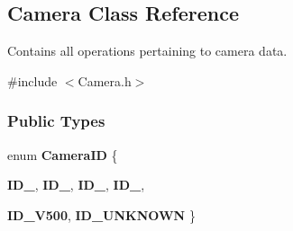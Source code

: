 \hypertarget{classCamera}{
\subsection{Camera Class Reference}
\label{classCamera}
}


Contains all operations pertaining to camera data.  




{\ttfamily \#include $<$Camera.h$>$}

\subsubsection*{Public Types}
\begin{DoxyCompactItemize}
\item 
enum {\bfseries CameraID} \{ \par
{\bfseries ID\_}, 
{\bfseries ID\_}, 
{\bfseries ID\_}, 
{\bfseries ID\_}, 
\par
{\bfseries ID\_\-V500}, 
{\bfseries ID\_\-UNKNOWN}
 \}
\end{DoxyCompactItemize}
